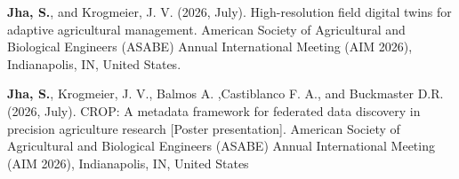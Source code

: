 \documentclass[10pt]{article}
\begin{document}
\begin{enumerate}[label={[\arabic*]}, leftmargin=3em, itemsep=0pt, topsep=0pt]
\item \textbf{Jha, S.}, and Krogmeier, J. V. (2026, July). High-resolution field digital twins for adaptive agricultural management. American Society of Agricultural and Biological Engineers (ASABE) Annual International Meeting (AIM 2026), Indianapolis, IN, United States.

\item \textbf{Jha, S.}, Krogmeier, J. V., Balmos A. ,Castiblanco F. A., and Buckmaster D.R. (2026, July). CROP: A metadata framework for federated data discovery in precision agriculture research [Poster presentation]. American Society of Agricultural and Biological Engineers (ASABE) Annual International Meeting (AIM 2026), Indianapolis, IN, United States


\end{enumerate}
\end{document}
